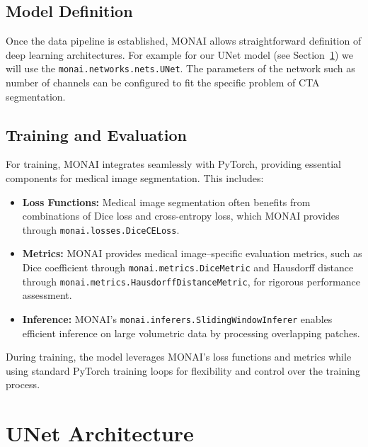 \subsection*{Model Definition}
Once the data pipeline is established, MONAI allows straightforward definition of deep learning architectures. 
For example for our UNet model (see Section~\ref{sec:unet_architecture}) we will use the \texttt{monai.networks.nets.UNet}. 
The parameters of the network such as number of channels can be configured to fit the specific problem of CTA segmentation.

\subsection*{Training and Evaluation}
For training, MONAI integrates seamlessly with PyTorch, providing essential components for medical image segmentation. 
This includes:
\begin{itemize}
    \item \textbf{Loss Functions:} Medical image segmentation often benefits from combinations of Dice loss and cross-entropy loss, which MONAI provides through \texttt{monai.losses.DiceCELoss}.
    \item \textbf{Metrics:} MONAI provides medical image–specific evaluation metrics, such as Dice coefficient through \texttt{monai.metrics.DiceMetric} and Hausdorff distance through \texttt{monai.metrics.HausdorffDistanceMetric}, for rigorous performance assessment.
    \item \textbf{Inference:} MONAI's \texttt{monai.inferers.SlidingWindowInferer} enables efficient inference on large volumetric data by processing overlapping patches.
\end{itemize}
During training, the model leverages MONAI's loss functions and metrics while using standard PyTorch training loops for flexibility and control over the training process.


\section{UNet Architecture}
\label{sec:unet_architecture}

